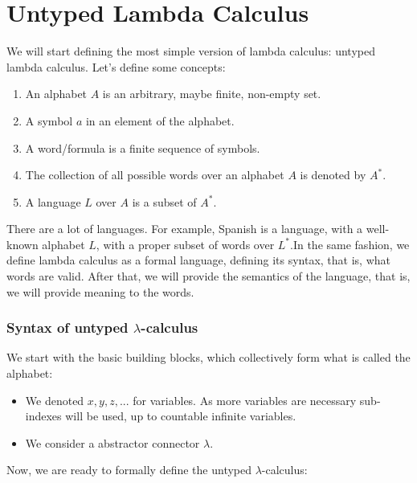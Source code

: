 

\section{Untyped Lambda Calculus }
We will start defining the most simple version of lambda calculus: untyped lambda calculus. Let's define some concepts:


\begin{enumerate}
\item An alphabet $A$ is an arbitrary, maybe finite, non-empty set.
\item A symbol $a$ in an element of the alphabet.
\item A word/formula is a finite sequence of symbols.
\item The collection of all possible words over an alphabet $A$ is denoted by $A^*$.
\item A language $L$ over $A$  is a subset of $A^*.$
\end{enumerate}

There are a lot of languages. For example, Spanish is a language, with a well-known alphabet $L$, with a proper subset of words over $L^*$.In the same fashion, we define lambda calculus as a formal language, defining its syntax, that is, what words are valid. After that, we will provide the semantics of the language, that is, we will provide meaning to the words.\\


\subsubsection{Syntax of untyped $\lambda$-calculus}
We start with the basic building blocks, which collectively form what is
called the alphabet:

\begin{itemize}
\item We denoted $x, y, z,...$ for variables. As more variables are necessary sub-indexes will be used, up to countable infinite variables.
\item We consider a abstractor connector $\lambda$.
\end{itemize}
Now, we are ready to formally define the untyped $\lambda$-calculus:

